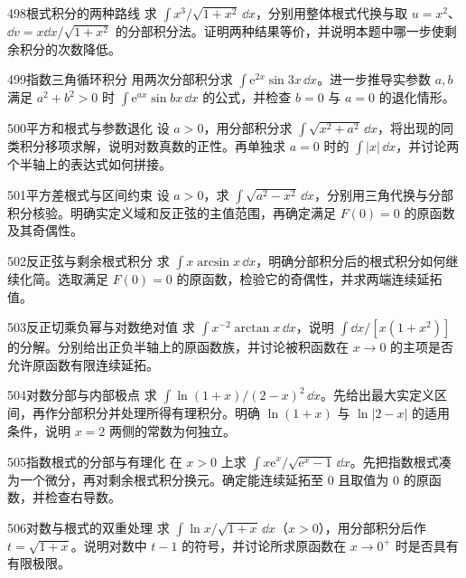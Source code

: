 \begin{exercise}{498}{根式积分的两种路线}
求 $\int x^3/\sqrt{1+x^2}\,\dd x$，分别用整体根式代换与取 $u=x^2$、$\dd v=x\dd x/\sqrt{1+x^2}$ 的分部积分法。证明两种结果等价，并说明本题中哪一步使剩余积分的次数降低。
\end{exercise}
\begin{exercise}{499}{指数三角循环积分}
用两次分部积分求 $\int\mathrm e^{2x}\sin3x\,\dd x$。进一步推导实参数 $a,b$ 满足 $a^2+b^2>0$ 时 $\int\mathrm e^{ax}\sin bx\,\dd x$ 的公式，并检查 $b=0$ 与 $a=0$ 的退化情形。
\end{exercise}
\begin{exercise}{500}{平方和根式与参数退化}
设 $a>0$，用分部积分求 $\int\sqrt{x^2+a^2}\,\dd x$，将出现的同类积分移项求解，说明对数真数的正性。再单独求 $a=0$ 时的 $\int|x|\,\dd x$，并讨论两个半轴上的表达式如何拼接。
\end{exercise}
\begin{exercise}{501}{平方差根式与区间约束}
设 $a>0$，求 $\int\sqrt{a^2-x^2}\,\dd x$，分别用三角代换与分部积分核验。明确实定义域和反正弦的主值范围，再确定满足 $F(0)=0$ 的原函数及其奇偶性。
\end{exercise}
\begin{exercise}{502}{反正弦与剩余根式积分}
求 $\int x\arcsin x\,\dd x$，明确分部积分后的根式积分如何继续化简。选取满足 $F(0)=0$ 的原函数，检验它的奇偶性，并求两端连续延拓值。
\end{exercise}
\begin{exercise}{503}{反正切乘负幂与对数绝对值}
求 $\int x^{-2}\arctan x\,\dd x$，说明 $\int\dd x/[x(1+x^2)]$ 的分解。分别给出正负半轴上的原函数族，并讨论被积函数在 $x\to0$ 的主项是否允许原函数有限连续延拓。
\end{exercise}
\begin{exercise}{504}{对数分部与内部极点}
求 $\int\ln(1+x)/(2-x)^2\,\dd x$。先给出最大实定义区间，再作分部积分并处理所得有理积分。明确 $\ln(1+x)$ 与 $\ln|2-x|$ 的适用条件，说明 $x=2$ 两侧的常数为何独立。
\end{exercise}
\begin{exercise}{505}{指数根式的分部与有理化}
在 $x>0$ 上求 $\int x\mathrm e^x/\sqrt{\mathrm e^x-1}\,\dd x$。先把指数根式凑为一个微分，再对剩余根式积分换元。确定能连续延拓至 $0$ 且取值为 $0$ 的原函数，并检查右导数。
\end{exercise}
\begin{exercise}{506}{对数与根式的双重处理}
求 $\int\ln x/\sqrt{1+x}\,\dd x$（$x>0$），用分部积分后作 $t=\sqrt{1+x}$。说明对数中 $t-1$ 的符号，并讨论所求原函数在 $x\to0^+$ 时是否具有有限极限。
\end{exercise}
